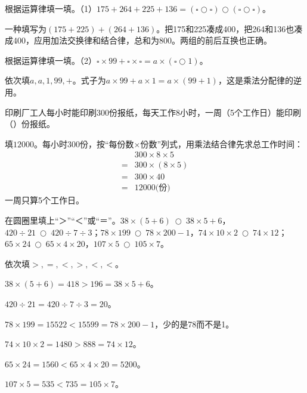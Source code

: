根据运算律填一填。（1）\(175+264+225+136=(\square\bigcirc\square)\bigcirc(\square\bigcirc\square)\)。\par
\begin{BookAnswer}
一种填写为\((175+225)+(264+136)\)。把175和225凑成400，把264和136也凑成400，应用加法交换律和结合律，总和为800。两组的前后互换也正确。
\end{BookAnswer}

根据运算律填一填。（2）\(\square\times99+\square\times\square=a\times(\square\bigcirc1)\)。\par
\begin{BookAnswer}
依次填\(a,a,1,99,+\)。式子为\(a\times99+a\times1=a\times(99+1)\)，这是乘法分配律的逆用。
\end{BookAnswer}

印刷厂工人每小时能印刷300份报纸，每天工作8小时，一周（5个工作日）能印刷（\hspace{1.8em}）份报纸。\par
\begin{BookAnswer}
填\(12000\)。每小时300份，按“每份数\(\times\)份数”列式，用乘法结合律先求总工作时间：\[\begin{aligned}&300\times8\times5\\={}&300\times(8\times5)\\={}&300\times40\\={}&12000\text{(份)}\end{aligned}\]一周只算5个工作日。
\end{BookAnswer}

在圆圈里填上“＞”“＜”或“＝”。\(38\times(5+6)\ \bigcirc\ 38\times5+6\)，\allowbreak{}\(420\div21\ \bigcirc\ 420\div7\div3\)；\allowbreak{}\(78\times199\ \bigcirc\ 78\times200-1\)，\allowbreak{}\(74\times10\times2\ \bigcirc\ 74\times12\)；\allowbreak{}\(65\times24\ \bigcirc\ 65\times4\times20\)，\allowbreak{}\(107\times5\ \bigcirc\ 105\times7\)。\par
\begin{BookAnswer}
依次填\(>,=,<,>,<,<\)。\par \(38\times(5+6)=418>196=38\times5+6\)。\par \(420\div21=420\div7\div3=20\)。\par \(78\times199=15522<15599=78\times200-1\)，少的是78而不是1。\par \(74\times10\times2=1480>888=74\times12\)。\par \(65\times24=1560<65\times4\times20=5200\)。\par \(107\times5=535<735=105\times7\)。
\end{BookAnswer}

